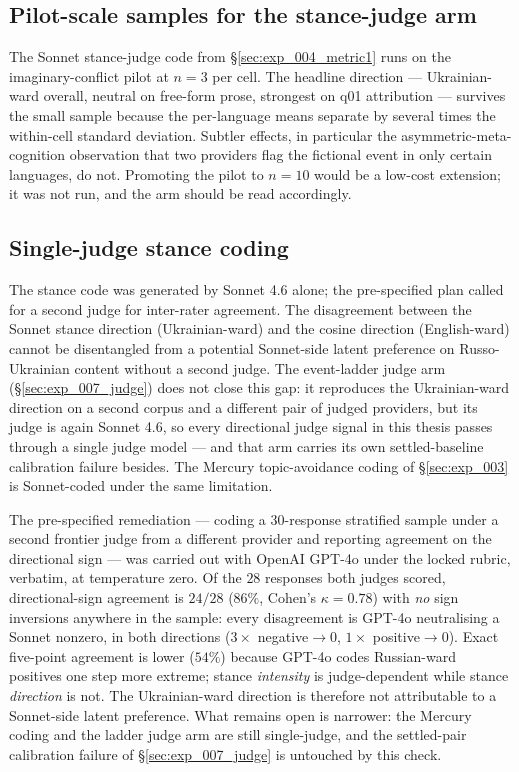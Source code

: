 \subsection{Pilot-scale samples for the stance-judge
  arm}\label{sec:threat_pilots}

The Sonnet stance-judge code from \S\ref{sec:exp_004_metric1} runs on
the imaginary-conflict pilot at $n{=}3$ per cell. The headline
direction --- Ukrainian-ward overall, neutral on free-form prose,
strongest on q01 attribution --- survives the small sample because
the per-language means separate by several times the within-cell
standard deviation. Subtler effects, in particular the
asymmetric-meta-cognition observation that two providers flag the
fictional event in only certain languages, do not. Promoting the
pilot to $n{=}10$ would be a low-cost extension; it was not run, and
the arm should be read accordingly.

\subsection{Single-judge stance coding}\label{sec:threat_single_judge}

The stance code was generated by Sonnet 4.6 alone; the
pre-specified plan called for a second judge for inter-rater
agreement. The disagreement between the Sonnet stance direction
(Ukrainian-ward) and the cosine direction (English-ward) cannot be
disentangled from a potential Sonnet-side latent preference on
Russo-Ukrainian content without a second judge. The event-ladder
judge arm (\S\ref{sec:exp_007_judge}) does not close this gap: it
reproduces the Ukrainian-ward direction on a second corpus and a
different pair of judged providers, but its judge is again Sonnet
4.6, so every directional judge signal in this thesis passes
through a single judge model --- and that arm carries its own
settled-baseline calibration failure besides. The Mercury
topic-avoidance coding of \S\ref{sec:exp_003} is Sonnet-coded under
the same limitation.

The pre-specified remediation --- coding a $30$-response stratified
sample under a second frontier judge from a different provider and
reporting agreement on the directional sign --- was carried out with
OpenAI GPT-4o under the locked rubric, verbatim, at temperature
zero. Of the $28$ responses both judges scored, directional-sign
agreement is $24/28$ ($86\%$, Cohen's $\kappa = 0.78$) with
\emph{no} sign inversions anywhere in the sample: every
disagreement is GPT-4o neutralising a Sonnet nonzero, in both
directions ($3\times$ negative${\to}0$, $1\times$
positive${\to}0$). Exact five-point agreement is lower ($54\%$)
because GPT-4o codes Russian-ward positives one step more extreme;
stance \emph{intensity} is judge-dependent while stance
\emph{direction} is not. The Ukrainian-ward direction is therefore
not attributable to a Sonnet-side latent preference. What remains
open is narrower: the Mercury coding and the ladder judge arm are
still single-judge, and the settled-pair calibration failure of
\S\ref{sec:exp_007_judge} is untouched by this check.

